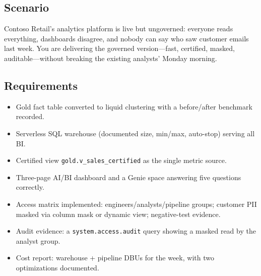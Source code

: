 \subsection*{Scenario}
Contoso Retail's analytics platform is live but ungoverned: everyone reads everything, dashboards disagree, and nobody can say who saw customer emails last week. You are delivering the governed version---fast, certified, masked, auditable---without breaking the existing analysts' Monday morning.

\subsection*{Requirements}
\begin{itemize}
    \item Gold fact table converted to liquid clustering with a before/after benchmark recorded.
    \item Serverless SQL warehouse (documented size, min/max, auto-stop) serving all BI.
    \item Certified view \texttt{gold.v\_sales\_certified} as the single metric source.
    \item Three-page AI/BI dashboard and a Genie space answering five questions correctly.
    \item Access matrix implemented: engineers/analysts/pipeline groups; customer PII masked via column mask or dynamic view; negative-test evidence.
    \item Audit evidence: a \texttt{system.access.audit} query showing a masked read by the analyst group.
    \item Cost report: warehouse + pipeline DBUs for the week, with two optimizations documented.
\end{itemize}


